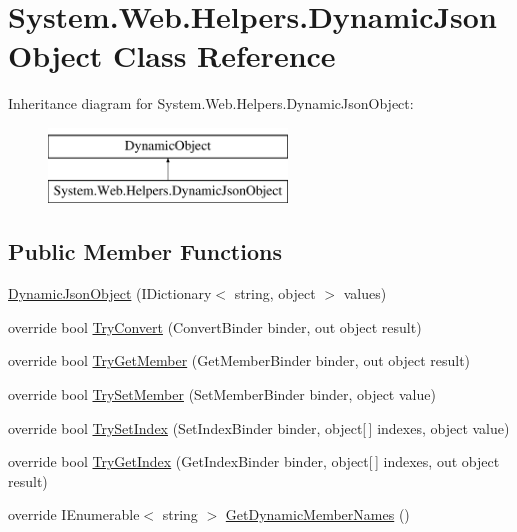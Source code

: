 \hypertarget{classSystem_1_1Web_1_1Helpers_1_1DynamicJsonObject}{}\section{System.\+Web.\+Helpers.\+Dynamic\+Json\+Object Class Reference}
\label{classSystem_1_1Web_1_1Helpers_1_1DynamicJsonObject}
Inheritance diagram for System.\+Web.\+Helpers.\+Dynamic\+Json\+Object\+:\begin{figure}[H]
\begin{center}
\leavevmode
\includegraphics[height=2.000000cm]{classSystem_1_1Web_1_1Helpers_1_1DynamicJsonObject}
\end{center}
\end{figure}
\subsection*{Public Member Functions}
\begin{DoxyCompactItemize}
\item 
\hyperlink{classSystem_1_1Web_1_1Helpers_1_1DynamicJsonObject_a0a7c3916979c303c6d4da79883d1a7be}{Dynamic\+Json\+Object} (I\+Dictionary$<$ string, object $>$ values)
\item 
override bool \hyperlink{classSystem_1_1Web_1_1Helpers_1_1DynamicJsonObject_ac56513cadafc61180a25a4810047af56}{Try\+Convert} (Convert\+Binder binder, out object result)
\item 
override bool \hyperlink{classSystem_1_1Web_1_1Helpers_1_1DynamicJsonObject_a3ce7ca4551d2b621d4d35db30ea69698}{Try\+Get\+Member} (Get\+Member\+Binder binder, out object result)
\item 
override bool \hyperlink{classSystem_1_1Web_1_1Helpers_1_1DynamicJsonObject_a2751e8fe84adaf0dd4c3430224b10203}{Try\+Set\+Member} (Set\+Member\+Binder binder, object value)
\item 
override bool \hyperlink{classSystem_1_1Web_1_1Helpers_1_1DynamicJsonObject_a6d9229dd7bc1149540e8c71b3755ed87}{Try\+Set\+Index} (Set\+Index\+Binder binder, object\mbox{[}$\,$\mbox{]} indexes, object value)
\item 
override bool \hyperlink{classSystem_1_1Web_1_1Helpers_1_1DynamicJsonObject_a6b5b97ca03d683937092e8d5506c20f7}{Try\+Get\+Index} (Get\+Index\+Binder binder, object\mbox{[}$\,$\mbox{]} indexes, out object result)
\item 
override I\+Enumerable$<$ string $>$ \hyperlink{classSystem_1_1Web_1_1Helpers_1_1DynamicJsonObject_a8b74bfcba4fe3d5ac1802c041159cbab}{Get\+Dynamic\+Member\+Names} ()
\end{DoxyCompactItemize}


